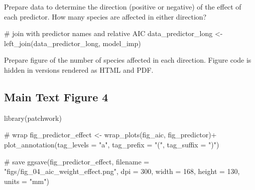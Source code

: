 \documentclass[]{article}
\newenvironment{Shaded}{}{}
\newcommand{\CommentTok}[1]{\textcolor[rgb]{0.00,0.50,0.00}{#1}}
\newcommand{\DataTypeTok}[1]{#1}
\newcommand{\DecValTok}[1]{#1}
\newcommand{\KeywordTok}[1]{\textcolor[rgb]{0.00,0.00,1.00}{#1}}
\newcommand{\NormalTok}[1]{#1}
\newcommand{\OperatorTok}[1]{#1}
\newcommand{\StringTok}[1]{\textcolor[rgb]{0.00,0.50,0.50}{#1}}
\begin{document}
Prepare data to determine the direction (positive or negative) of the effect of each predictor. How many species are affected in either direction?

\begin{Shaded}
\begin{Highlighting}[]
\CommentTok{# join with predictor names and relative AIC}
\NormalTok{data_predictor_long <-}\StringTok{ }\KeywordTok{left_join}\NormalTok{(data_predictor_long, model_imp)}
\end{Highlighting}
\end{Shaded}

Prepare figure of the number of species affected in each direction. Figure code is hidden in versions rendered as HTML and PDF.

\hypertarget{main-text-figure-4}{%
\subsection{Main Text Figure 4}\label{main-text-figure-4}}

\begin{Shaded}
\begin{Highlighting}[]
\KeywordTok{library}\NormalTok{(patchwork)}

\CommentTok{# wrap}
\NormalTok{fig_predictor_effect <-}\StringTok{ }
\StringTok{  }\KeywordTok{wrap_plots}\NormalTok{(fig_aic, fig_predictor)}\OperatorTok{+}
\StringTok{  }\KeywordTok{plot_annotation}\NormalTok{(}\DataTypeTok{tag_levels =} \StringTok{"a"}\NormalTok{,}
                  \DataTypeTok{tag_prefix =} \StringTok{"("}\NormalTok{,}
                  \DataTypeTok{tag_suffix =} \StringTok{")"}\NormalTok{)}

\CommentTok{# save}
\KeywordTok{ggsave}\NormalTok{(fig_predictor_effect,}
       \DataTypeTok{filename =} \StringTok{"figs/fig_04_aic_weight_effect.png"}\NormalTok{,}
       \DataTypeTok{dpi =} \DecValTok{300}\NormalTok{,}
       \DataTypeTok{width =} \DecValTok{168}\NormalTok{, }\DataTypeTok{height =} \DecValTok{130}\NormalTok{, }\DataTypeTok{units =} \StringTok{"mm"}\NormalTok{)}
\end{Highlighting}
\end{Shaded}
\end{document}
